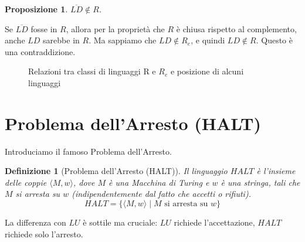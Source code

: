 \documentclass[a4paper]{article}
\makeatletter
\newtheorem{definition}{Definizione}[section] %
\newtheorem{proposition}{Proposizione}[section]
\renewenvironment{proof}[1][\proofname]{\par
  \pushQED{\qed}%
  \normalfont \topsep6\p@\@plus6\p@\relax
  \trivlist
  \item[\hskip\labelsep
        \bfseries
    #1\@addpunct{.}]\ignorespaces
}{%
  \popQED\endtrivlist\@endpefalse
}
\makeatother
\begin{document}
\begin{proposition}
$\overline{LD} \notin R$.
\end{proposition}
\begin{proof}
Se $\overline{LD}$ fosse in $R$, allora per la proprietà che $R$ è chiusa rispetto al complemento, anche $LD$ sarebbe in $R$. Ma sappiamo che $LD \notin R_e$, e quindi $LD \notin R$. Questo è una contraddizione.
\end{proof}

\begin{figure}[h!]
    \centering
    \caption{Relazioni tra classi di linguaggi R e $R_e$ e posizione di alcuni linguaggi}
    \label{fig:r_re_map}
\end{figure}

\section{Problema dell'Arresto (HALT)}
Introduciamo il famoso Problema dell'Arresto.
\begin{definition}[Problema dell'Arresto (HALT)]
Il linguaggio $HALT$ è l'insieme delle coppie $\langle M, w \rangle$, dove $M$ è una Macchina di Turing e $w$ è una stringa, tali che $M$ si arresta su $w$ (indipendentemente dal fatto che accetti o rifiuti).
\[ HALT = \{ \langle M, w \rangle \mid M \text{ si arresta su } w \} \]
\end{definition}
La differenza con $LU$ è sottile ma cruciale: $LU$ richiede l'accettazione, $HALT$ richiede solo l'arresto.
\end{document}
